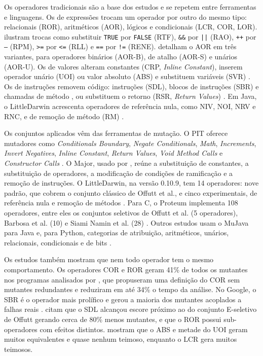 Os operadores tradicionais são a base dos estudos e se repetem entre ferramentas e linguagens. Os de expressões trocam um operador por outro do mesmo tipo: relacionais (ROR), aritméticos (AOR), lógicos e condicionais (LCR, COR, LOR).  ilustram trocas como substituir \texttt{TRUE} por \texttt{FALSE} (RTF), \texttt{\&\&} por \texttt{||} (RAO), \texttt{++} por \texttt{--} (RPM), \texttt{>=} por \texttt{<=} (RLL) e \texttt{==} por \texttt{!=} (RENE).  detalham o AOR em três variantes, para operadores binários (AOR-B), de atalho (AOR-S) e unários (AOR-U). Os de valores alteram constantes (CRP, \textit{Inline Constant}), inserem operador unário (UOI) ou valor absoluto (ABS) e substituem variáveis (SVR) \cite{chauhan2015, yao2014}. Os de instruções removem código: instruções (SDL), blocos de instruções (SBR) e chamadas de método \cite{jalbert2012, petrovic2021}, ou substituem o retorno (RSR, \textit{Return Values}) \cite{chauhan2015, assylbekov2013}. Em Java, o LittleDarwin acrescenta operadores de referência nula, como NIV, NOI, NRV e RNC, e de remoção de método (RM) \cite{ashong2025}.

Os conjuntos aplicados vêm das ferramentas de mutação. O PIT oferece mutadores como \textit{Conditionals Boundary}, \textit{Negate Conditionals}, \textit{Math}, \textit{Increments}, \textit{Invert Negatives}, \textit{Inline Constant}, \textit{Return Values}, \textit{Void Method Calls} e \textit{Constructor Calls} \cite{assylbekov2013, zhang2022, ojdanic2023}. O Major, usado por , reúne a substituição de constantes, a substituição de operadores, a modificação de condições de ramificação e a remoção de instruções. O LittleDarwin, na versão 0.10.9, tem 14 operadores: nove padrão, que cobrem o conjunto clássico de Offutt et al., e cinco experimentais, de referência nula e remoção de métodos \cite{ashong2025}. Para C, o Proteum implementa 108 operadores, entre eles os conjuntos seletivos de Offutt et al. (5 operadores), Barbosa et al. (10) e Siami Namin et al. (28) \cite{zhang2010}. Outros estudos usam o MuJava para Java \cite{chauhan2015, nica2011} e, para Python, categorias de atribuição, aritméticos, unários, relacionais, condicionais e de bits \cite{guerino2024}.

Os estudos também mostram que nem todo operador tem o mesmo comportamento. Os operadores COR e ROR geram 41\% de todos os mutantes nos programas analisados por , que propuseram uma definição do COR sem mutantes redundantes e reduziram em até 34\% o tempo da análise. No Google, o SBR é o operador mais prolífico e gerou a maioria dos mutantes acoplados a falhas reais \cite{petrovic2021}.  citam que o SDL alcançou escore próximo ao do conjunto E-seletivo de Offutt gerando cerca de 80\% menos mutantes, e que o ROR possui sub-operadores com efeitos distintos.  mostram que o ABS e metade do UOI geram muitos equivalentes e quase nenhum teimoso, enquanto o LCR gera muitos teimosos.

